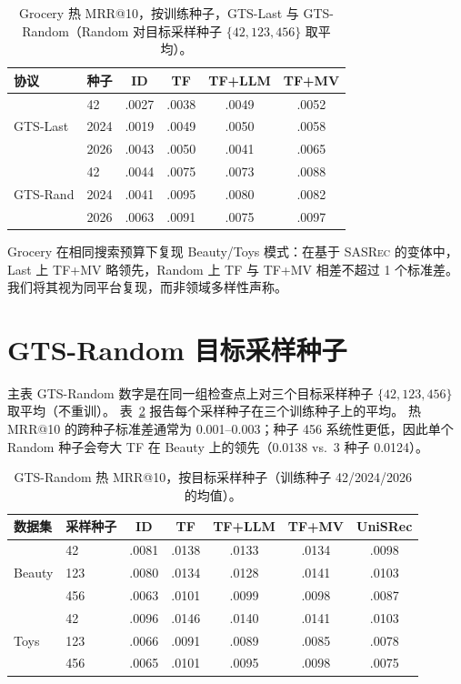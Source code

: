\documentclass[sigconf,natbib=true,anonymous]{acmart}
\newcommand{\tfmv}{\textsc{TF+MV}\xspace}
\newcommand{\base}{\textsc{SASRec}\xspace}
\begin{document}
\begin{table}[h]
\centering
\caption{Grocery 热 MRR@10，按训练种子，GTS-Last 与 GTS-Random（Random 对目标采样种子 $\{42,123,456\}$ 取平均）。}
\label{tab:grocery-perseed}
\small
\setlength{\tabcolsep}{3pt}
\begin{tabular}{@{}llcccc@{}}
\toprule
协议 & 种子 & ID & TF & TF+LLM & TF+MV \\
\midrule
\multirow{3}{*}{GTS-Last}
 & 42    & .0027 & .0038 & .0049 & .0052 \\
 & 2024  & .0019 & .0049 & .0050 & .0058 \\
 & 2026  & .0043 & .0050 & .0041 & .0065 \\
\midrule
\multirow{3}{*}{GTS-Rand}
 & 42    & .0044 & .0075 & .0073 & .0088 \\
 & 2024  & .0041 & .0095 & .0080 & .0082 \\
 & 2026  & .0063 & .0091 & .0075 & .0097 \\
\bottomrule
\end{tabular}
\end{table}

Grocery 在相同搜索预算下复现 Beauty/Toys 模式：在基于 \base 的变体中，Last 上 \tfmv 略领先，Random 上 TF 与 \tfmv 相差不超过 1 个标准差。
我们将其视为同平台复现，而非领域多样性声称。

\section{GTS-Random 目标采样种子}
\label{app:random-seeds}

主表 GTS-Random 数字是在同一组检查点上对三个目标采样种子 $\{42,123,456\}$ 取平均（不重训）。
表~\ref{tab:random-seeds} 报告每个采样种子在三个训练种子上的平均。
热 MRR@10 的跨种子标准差通常为 0.001--0.003；种子 456 系统性更低，因此单个 Random 种子会夸大 TF 在 Beauty 上的领先（0.0138 vs.\ 3 种子 0.0124）。

\begin{table}[h]
\centering
\caption{GTS-Random 热 MRR@10，按目标采样种子（训练种子 42/2024/2026 的均值）。}
\label{tab:random-seeds}
\small
\setlength{\tabcolsep}{3pt}
\begin{tabular}{@{}llccccc@{}}
\toprule
数据集 & 采样种子 & ID & TF & TF+LLM & TF+MV & UniSRec \\
\midrule
\multirow{3}{*}{Beauty}
 & 42    & .0081 & .0138 & .0133 & .0134 & .0098 \\
 & 123   & .0080 & .0134 & .0128 & .0141 & .0103 \\
 & 456   & .0063 & .0101 & .0099 & .0098 & .0087 \\
\midrule
\multirow{3}{*}{Toys}
 & 42    & .0096 & .0146 & .0140 & .0141 & .0103 \\
 & 123   & .0066 & .0091 & .0089 & .0085 & .0078 \\
 & 456   & .0065 & .0101 & .0095 & .0098 & .0075 \\
\bottomrule
\end{tabular}
\end{table}
\end{document}
